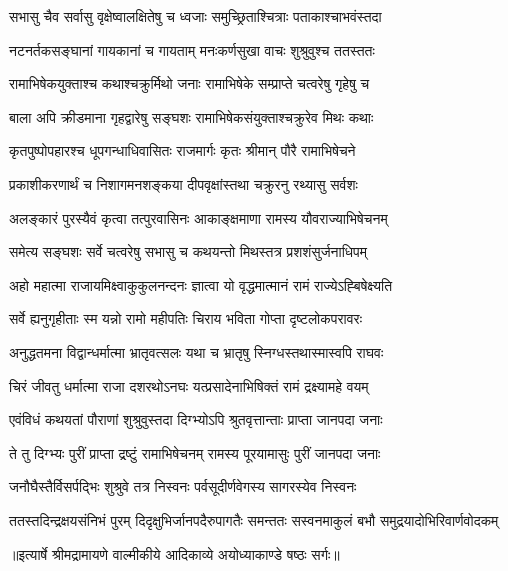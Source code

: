 \twolineshloka
{सभासु चैव सर्वासु वृक्षेष्वालक्षितेषु च}
{ध्वजाः समुच्छ्रिताश्चित्राः पताकाश्चाभवंस्तदा} %

\twolineshloka
{नटनर्तकसङ्घानां गायकानां च गायताम्}
{मनःकर्णसुखा वाचः शुश्रुवुश्च ततस्ततः} %

\twolineshloka
{रामाभिषेकयुक्ताश्च कथाश्चक्रुर्मिथो जनाः}
{रामाभिषेके सम्प्राप्ते चत्वरेषु गृहेषु च} %

\twolineshloka
{बाला अपि क्रीडमाना गृहद्वारेषु सङ्घशः}
{रामाभिषेकसंयुक्ताश्चक्रुरेव मिथः कथाः} %

\twolineshloka
{कृतपुष्पोपहारश्च धूपगन्धाधिवासितः}
{राजमार्गः कृतः श्रीमान् पौरै रामाभिषेचने} %

\twolineshloka
{प्रकाशीकरणार्थं च निशागमनशङ्कया}
{दीपवृक्षांस्तथा चक्रुरनु रथ्यासु सर्वशः} %

\twolineshloka
{अलङ्कारं पुरस्यैवं कृत्वा तत्पुरवासिनः}
{आकाङ्क्षमाणा रामस्य यौवराज्याभिषेचनम्} %

\twolineshloka
{समेत्य सङ्घशः सर्वे चत्वरेषु सभासु च}
{कथयन्तो मिथस्तत्र प्रशशंसुर्जनाधिपम्} %

\twolineshloka
{अहो महात्मा राजायमिक्ष्वाकुकुलनन्दनः}
{ज्ञात्वा यो वृद्धमात्मानं रामं राज्येऽह्बिषेक्ष्यति} %

\twolineshloka
{सर्वे ह्यनुगृहीताः स्म यन्नो रामो महीपतिः}
{चिराय भविता गोप्ता दृष्टलोकपरावरः} %

\twolineshloka
{अनुद्धतमना विद्वान्धर्मात्मा भ्रातृवत्सलः}
{यथा च भ्रातृषु स्निग्धस्तथास्मास्वपि राघवः} %

\twolineshloka
{चिरं जीवतु धर्मात्मा राजा दशरथोऽनघः}
{यत्प्रसादेनाभिषिक्तं रामं द्रक्ष्यामहे वयम्} %

\twolineshloka
{एवंविधं कथयतां पौराणां शुश्रुवुस्तदा}
{दिग्भ्योऽपि श्रुतवृत्तान्ताः प्राप्ता जानपदा जनाः} %

\twolineshloka
{ते तु दिग्भ्यः पुरीं प्राप्ता द्रष्टुं रामाभिषेचनम्}
{रामस्य पूरयामासुः पुरीं जानपदा जनाः} %

\twolineshloka
{जनौघैस्तैर्विसर्पद्भिः शुश्रुवे तत्र निस्वनः}
{पर्वसूदीर्णवेगस्य सागरस्येव निस्वनः} %

\fourlineindentedshloka
{ततस्तदिन्द्रक्षयसंनिभं पुरम्}
{दिदृक्षुभिर्जानपदैरुपागतैः}
{समन्ततः सस्वनमाकुलं बभौ}
{समुद्रयादोभिरिवार्णवोदकम्} %


{॥इत्यार्षे श्रीमद्रामायणे वाल्मीकीये आदिकाव्ये अयोध्याकाण्डे षष्ठः सर्गः॥}


